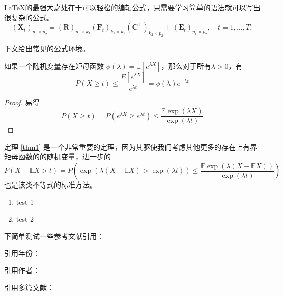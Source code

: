 \documentclass{NauThesis}
\begin{document}
\LaTeX 的最强大之处在于可以轻松的编辑公式，只需要学习简单的语法就可以写出很复杂的公式。
\begin{equation} \label{mfm}
	\left(\mathbf{X}_t\right)_{p_1 \times p_2}=(\mathbf{R})_{p_1 \times k_1}\left(\mathbf{F}_t\right)_{k_1 \times k_2}\left(\mathbf{C}^{\top}\right)_{k_2 \times p_2}+\left(\mathbf{E}_t\right)_{p_1 \times p_2}, \quad t=1, \ldots, T,
\end{equation}

下文给出常见的公式环境。

\begin{theorem}[由矩母函数导出的不等式] \label{thm1}
	如果一个随机变量存在矩母函数 $\phi(\lambda)=\mathbb{E}\left[e^{\lambda X}\right]$，那么对于所有$\lambda>0$，有
	\begin{equation}
		P(X \geq t) \leq \frac{E\left[e^{\lambda X}\right]}{e^{\lambda t}}=\phi(\lambda) e^{-\lambda t}
	\end{equation}
	
\end{theorem}
\begin{proof}
	易得
	\begin{equation}
		P(X \geq t)=P\left(e^{\lambda X} \geq e^{\lambda t}\right) \leq \frac{\mathbb{E} \exp (\lambda X)}{\exp (\lambda t)}
	\end{equation}
\end{proof}

\begin{remark}
	定理 \ref{thm1} 是一个非常重要的定理，因为其驱使我们考虑其他更多的存在上有界矩母函数的的随机变量，进一步的
	\begin{equation}
		P(X-\mathbb{E} X>t)=P\left(\exp (\lambda(X-\mathbb{E} X)>\exp (\lambda t)) \leq \frac{\mathbb{E} \exp (\lambda(X-\mathbb{E} X))}{\exp (\lambda t)}\right)
	\end{equation}
	也是该类不等式的标准方法。
\end{remark}

\begin{enumerate}[label={(\arabic*)}]
    \item test 1
    \item test 2
\end{enumerate}

下简单测试一些参考文献引用：

引用年份：\citet{__2006}

引用作者：\citep{tsui_multidimensional_1995}

引用多篇文献：\citep{_20132018_2021,__2006,maasoumi_measurement_1986,kolm_multidimensional_1977}
\end{document}

